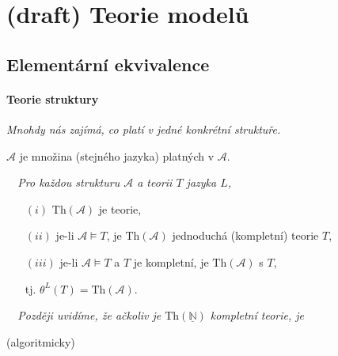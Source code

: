 \chapter{(draft) Teorie modelů}\todo




\section{Elementární ekvivalence}\todo


\subsubsection*{Teorie struktury}

{\it Mnohdy nás zajímá, co platí v jedné konkrétní struktuře.}
\bigskip


 $\mathcal{A}$ je množina   (stejného jazyka) platných v $\mathcal{A}$.
\medskip

{\it {}\ \ Pro každou strukturu $\mathcal{A}$ a teorii $T$ jazyka $L$,
\smallskip

\begin{enumerate}
\item[$(i)$] $\mathrm{Th}(\mathcal{A})$ je  teorie,
\smallskip

\item[$(ii)$] je-li $\mathcal{A}\models T$, je $\mathrm{Th}(\mathcal{A})$ jednoduchá (kompletní)  teorie $T$,
\smallskip

\item[$(iii)$] je-li $\mathcal{A}\models T$ a $T$ je kompletní, je $\mathrm{Th}(\mathcal{A})$  s $T$,
\smallskip

tj. $\theta^L(T)=\mathrm{Th}(\mathcal{A})$.
\end{enumerate}}
\medskip

\bigskip

{\it {}\ \ Později uvidíme, že ačkoliv je $\mathrm{Th}(\underline{\mathbb{N}})$ kompletní teorie, je
\smallskip

(algoritmicky) }



